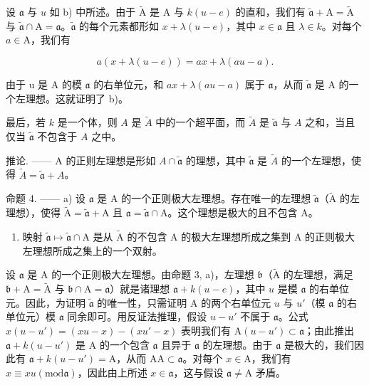 设 \(\mathfrak{a}\) 与 \(u\) 如 b) 中所述。由于 \(\widetilde{\mathrm{A}}\) 是 \(\mathrm{A}\) 与 \(k(u - e)\) 的直和，我们有 \(\widetilde{\mathfrak{a}} + \mathrm{A} = \widetilde{\mathrm{A}}\) 与 \(\widetilde{\mathfrak{a}} \cap \mathrm{A} = \mathfrak{a}\)。\(\widetilde{\mathfrak{a}}\) 的每个元素都形如 \(x + \lambda (u - e)\)，其中 \(x \in \mathfrak{a}\) 且 \(\lambda \in k\)。对每个 \(a \in \mathrm{A}\)，我们有

\[
a (x + \lambda (u - e)) = a x + \lambda (a u - a).
\]

由于 u 是 A 的模 \(\mathfrak{a}\) 的右单位元，和 \(ax + \lambda(au - a)\) 属于 \(\mathfrak{a}\)，从而 \(\widetilde{\mathfrak{a}}\) 是 A 的一个左理想。这就证明了 b)。

最后，若 \(k\) 是一个体，则 \(A\) 是 \(\widetilde{A}\) 中的一个超平面，而 \(\widetilde{A}\) 是 \(\widetilde{\mathfrak{a}}\) 与 \(A\) 之和，当且仅当 \(\widetilde{\mathfrak{a}}\) 不包含于 \(A\) 之中。

推论. —— A 的正则左理想是形如 \(A \cap \widetilde{\mathfrak{a}}\) 的理想，其中 \(\widetilde{\mathfrak{a}}\) 是 \(\widetilde{A}\) 的一个左理想，使得 \(\widetilde{A} = \widetilde{\mathfrak{a}} + A\)。

命题 4. —— a) 设 \(\mathfrak{a}\) 是 A 的一个正则极大左理想。存在唯一的左理想 \(\widetilde{\mathfrak{a}}\)（\(\widetilde{\mathrm{A}}\) 的左理想），使得 \(\widetilde{\mathrm{A}} = \widetilde{\mathfrak{a}} + \mathrm{A}\) 且 \(\mathfrak{a} = \widetilde{\mathfrak{a}} \cap \mathrm{A}\)。这个理想是极大的且不包含 A。

\begin{enumerate}
\def\labelenumi{\alph{enumi})}
\setcounter{enumi}{1}
\tightlist
\item
  映射 \(\widetilde{\mathfrak{a}}\mapsto \widetilde{\mathfrak{a}}\cap \mathrm{A}\) 是从 \(\widetilde{\mathrm{A}}\) 的不包含 A 的极大左理想所成之集到 A 的正则极大左理想所成之集上的一个双射。
\end{enumerate}

设 \(\mathfrak{a}\) 是 A 的一个正则极大左理想。由命题 3, a)，左理想 \(\mathfrak{b}\)（\(\widetilde{\mathrm{A}}\) 的左理想，满足 \(\mathfrak{b} + \mathrm{A} = \widetilde{\mathrm{A}}\) 与 \(\mathfrak{b} \cap \mathrm{A} = \mathfrak{a}\)）就是诸理想 \(\mathfrak{a} + k(u - e)\)，其中 \(u\) 是模 \(\mathfrak{a}\) 的右单位元。因此，为证明 \(\widetilde{\mathfrak{a}}\) 的唯一性，只需证明 A 的两个右单位元 \(u\) 与 \(u'\)（模 \(\mathfrak{a}\) 的右单位元）模 \(\mathfrak{a}\) 同余即可。用反证法推理，假设 \(u - u'\) 不属于 \(\mathfrak{a}\)。公式 \(x(u - u') = (xu - x) - (xu' - x)\) 表明我们有 \(\mathrm{A}(u - u') \subset \mathfrak{a}\)；由此推出 \(\mathfrak{a} + k(u - u')\) 是 A 的一个包含 \(\mathfrak{a}\) 且异于 \(\mathfrak{a}\) 的左理想。由于 \(\mathfrak{a}\) 是极大的，我们因此有 \(\mathfrak{a} + k(u - u') = \mathrm{A}\)，从而 \(\mathrm{AA} \subset \mathfrak{a}\)。对每个 \(x \in \mathrm{A}\)，我们有 \(x \equiv xu (\mathrm{mod} \mathfrak{a})\)，因此由上所述 \(x \in \mathfrak{a}\)，这与假设 \(\mathfrak{a} \neq \mathrm{A}\) 矛盾。

